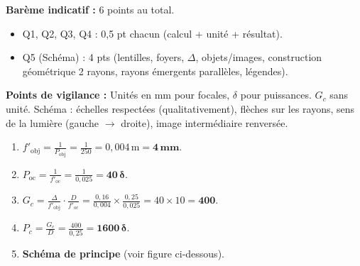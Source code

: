 \documentclass[11pt]{article}
\begin{document}
\begin{corrige}
\textbf{Barème indicatif :} 6 points au total.
\begin{itemize}
    \item Q1, Q2, Q3, Q4 : 0,5 pt chacun (calcul + unité + résultat).
    \item Q5 (Schéma) : 4 pts (lentilles, foyers, $\Delta$, objets/images, construction géométrique 2 rayons, rayons émergents parallèles, légendes).
\end{itemize}
\textbf{Points de vigilance :} Unités en mm pour focales, $\delta$ pour puissances. $G_c$ sans unité. Schéma : échelles respectées (qualitativement), flèches sur les rayons, sens de la lumière (gauche $\to$ droite), image intermédiaire renversée.

\begin{enumerate}
    \item $f'_{\text{obj}} = \frac{1}{P_{\text{obj}}} = \frac{1}{250} = 0,004\,\text{m} = \mathbf{4\,\text{mm}}$.
    \item $P_{\text{oc}} = \frac{1}{f'_{\text{oc}}} = \frac{1}{0,025} = \mathbf{40\,\delta}$.
    \item $G_c = \frac{\Delta}{f'_{\text{obj}}} \cdot \frac{D}{f'_{\text{oc}}} = \frac{0,16}{0,004} \times \frac{0,25}{0,025} = 40 \times 10 = \mathbf{400}$.
    \item $P_c = \frac{G_c}{D} = \frac{400}{0,25} = \mathbf{1600\,\delta}$.
    \item \textbf{Schéma de principe} (voir figure ci-dessous).
\end{enumerate}

\begin{popfigure}
\end{popfigure}
\end{corrige}
\end{document}
